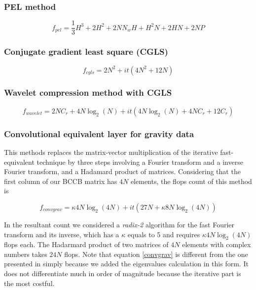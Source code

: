 \documentclass[utf8]{FrontiersinHarvard} %
\begin{document}
\subsubsection{PEL method \citep{oliveirajr-etal2013}}

\begin{equation}
	f_{pel} = \dfrac{1}{3} H^3 + 2H^2 + 2NN_wH + H^2N + 2HN + 2NP
\label{flops_pel}
\end{equation}

\subsubsection{Conjugate gradient least square (CGLS)}

\begin{equation}
	f_{cgls} = 2N^2 + it(4N^2 + 12N)
\label{cgls}
\end{equation}

\subsubsection{Wavelet compression method with CGLS \citep{li-oldenburg2010}}

\begin{equation}
	f_{wavelet} = 2NC_r + 4N\log_2(N) + it(4N\log_2(N) + 4NC_r + 12C_r)
\label{wavelet}
\end{equation}

\subsubsection{Convolutional equivalent layer for gravity data \citep{takahashi2020convolutional}}

This methods replaces the matrix-vector multiplication of the iterative fast-equivalent technique \citep{siqueira-etal2017} by three steps involving a Fourier transform and a inverse Fourier transform, 
and a Hadamard product of matrices. Considering that the first column of our BCCB matrix has $4N$ elements, the flops count of this method is

\begin{equation}
	f_{convgrav} = \kappa4N\log_2(4N) + it(27N + \kappa8N\log_2(4N))
\label{convgrav}
\end{equation}

In the resultant count we considered a \textit{radix-2} algorithm for the fast Fourier transform and its inverse, which has a $\kappa$ equals to 5 and requires $\kappa4N\log_2(4N)$ flops each. The Hadarmard product of two matrices of $4N$ elements with complex numbers takes $24N$ flops. Note that equation \ref{convgrav} is different from the one presented in \cite{takahashi2020convolutional} simply because we added the eigenvalues calculation in this form. It does not differentiate much in order of magnitude because the iterative part is the most costful.
\end{document}
